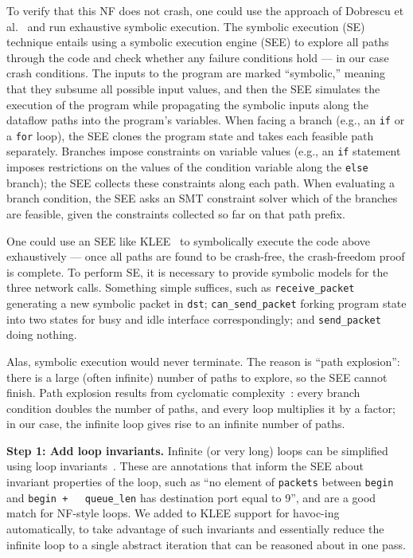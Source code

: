 \documentclass[letterpaper,twocolumn,10pt]{article}
\newcommand{\code}[1]{\lstinline{#1}}
\begin{document}
To verify that this NF does not crash, one could use the approach of Dobrescu et
al.~\cite{dobrescu2014software} and run exhaustive symbolic execution. The
symbolic execution (SE) technique entails using a symbolic execution engine
(SEE) to explore all paths through the code and check whether any failure
conditions hold --- in our case crash conditions. The inputs to the program are
marked ``symbolic,'' meaning that they subsume all possible input values, and
then the SEE simulates the execution of the program while propagating the
symbolic inputs along the dataflow paths into the program's variables. When
facing a branch (e.g., an \code{if} or a \code{for} loop), the SEE clones the
program state and takes each feasible path separately. Branches impose
constraints on variable values (e.g., an \code{if} statement imposes
restrictions on the values of the condition variable along the \code{else}
branch); the SEE collects these constraints along each path. When evaluating a
branch condition, the SEE asks an SMT constraint solver which of the branches
are feasible, given the constraints collected so far on that path prefix.

One could use an SEE like KLEE~\cite{cadar2008klee} to symbolically execute the
code above exhaustively --- once all paths are found to be crash-free, the
crash-freedom proof is complete. To perform SE, it is necessary to provide
symbolic models for the three network calls. Something simple suffices, such as
\code{receive_packet} generating a new symbolic packet in \code{dst};
\code{can_send_packet} forking program state into two states for busy and idle
interface correspondingly; and \code{send_packet} doing nothing.

Alas, symbolic execution would never terminate. The reason is ``path
explosion'': there is a large (often infinite) number of paths to explore, so
the SEE cannot finish. Path explosion results from cyclomatic
complexity~\cite{mccabe:cyclomatic}: every branch condition doubles the number
of paths, and every loop multiplies it by a factor; in our case, the infinite
loop gives rise to an infinite number of paths.

{\bf Step 1: Add loop invariants.} Infinite (or very long) loops can be
simplified using loop invariants~\cite[\S~2.1]{cormen2009introduction}. These
are annotations that inform the SEE about invariant properties of the loop, such
as ``no element of \code{packets} between \code{begin} and \code{begin +
  queue_len} has destination port equal to 9'', and are a good match for
NF-style loops.  We added to KLEE support for havoc-ing~\cite{barnett2005boogie}
automatically, to take advantage of such invariants and essentially reduce the
infinite loop to a single abstract iteration that can be reasoned about in one
pass.
 
\end{document}
